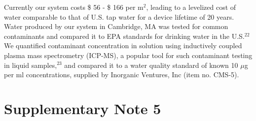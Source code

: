 \documentclass[11pt]{article}
\begin{document}
Currently our system costs \$ 56 - \$ 166 per m$^{2}$, leading to a levelized cost of water comparable to that of U.S. tap water for a device lifetime of 20 years. Water produced by our system in Cambridge, MA was tested for common contaminants and compared it to EPA standards for drinking water in the U.S.$^{22}$ We quantified contaminant concentration in solution using inductively coupled plasma mass spectrometry (ICP-MS), a popular tool for such contaminant testing in liquid samples,$^{23}$ and compared it to a water quality standard of known 10 $\mu$g per ml concentrations, supplied by Inorganic Ventures, Inc (item no. CMS-5).

\section{Supplementary Note 5}
\end{document}
